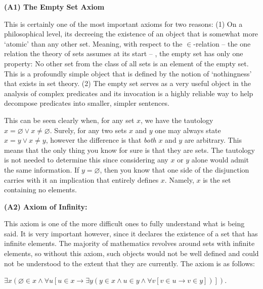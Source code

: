 \documentclass[12pt, a4paper]{article}
\begin{document}
\begin{description}

	\item\textbf{(A1) The Empty Set Axiom }\par
This is certainly one of the most important axioms for two reasons: (1) On a philosophical level, its decreeing the existence of an object that is somewhat more `atomic' than any other set. Meaning, with respect to the $\in$-relation -- the one relation the theory of sets assumes at its start -- , the empty set has only one property: No other set from the class of all sets is an element of the empty set. This is a profoundly simple object that is defined by the notion of `nothingness' that exists in set theory. (2) The empty set serves as a very useful object in the analysis of complex predicates and its invocation is a highly reliable way to help decompose predicates into smaller, simpler sentences.\par
 This can be seen clearly when, for any set $x$, we have the tautology $x=\varnothing\vee x\neq\varnothing$. Surely, for any two sets $x$ and $y$ one may always state $x=y\vee x\neq y$, however the difference is that \textit{both} $x$ and $y$ are arbitrary. This means that the only thing you know for sure is that they are sets. The tautology is not needed to determine this since considering any $x$ or $y$ alone would admit the same information. If $y=\varnothing$, then you know that one side of the disjunction carries with it an implication that entirely defines $x$. Namely, $x$ is the set containing no elements.
 
 
    \item\textbf{(A2) Axiom of Infinity: }\par
This axiom is one of the more difficult ones to fully understand what is being said. It is very important however, since it declares the existence of a set that has infinite elements. The majority of mathematics revolves around sets with infinite elements, so without this axiom, such objects would not be well defined and could not be understood to the extent that they are currently. The axiom is as follows:\par

\vspace{4mm}

\centerline{$\exists x(\varnothing\in x\wedge\forall u[u\in x\rightarrow\exists y(y\in x\wedge u\in y\wedge\forall v[v\in u\rightarrow v\in y])])$.}

\vspace{4mm}


\end{description}
\end{document}
